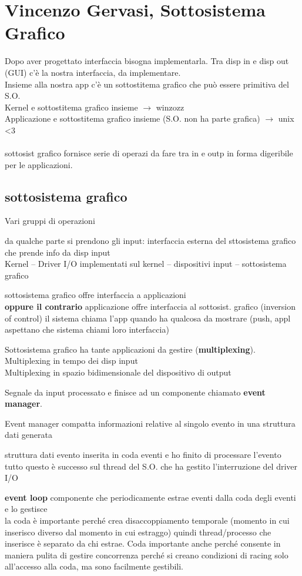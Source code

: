 \documentclass[10pt]{article}
\begin{document}
\section{Vincenzo Gervasi, Sottosistema Grafico}
Dopo aver progettato interfaccia bisogna implementarla. Tra disp in e disp out (GUI) c'è la nostra interfaccia, da implementare.\\
Insieme alla nostra app c'è un sottostitema grafico che può essere primitiva del S.O.\\
Kernel e sottostitema grafico insieme $\rightarrow$ winzozz\\
Applicazione e sottostitema grafico insieme (S.O. non ha parte grafica) $\rightarrow$ unix <3\\\\
sottosist grafico fornisce serie di operazi da fare tra in e outp in forma digeribile per le applicazioni.
\subsection{sottosistema grafico}
Vari gruppi di operazioni
\begin{list}{}{}
\item da qualche parte si prendono gli input: interfaccia esterna del sttosistema grafico che prende info da disp input\\
Kernel -- Driver I/O implementati sul kernel -- dispositivi input -- sottosistema grafico
\item sottosistema grafico offre interfaccia a applicazioni\\
\textbf{oppure il contrario} applicazione offre interfaccia al sottosist. grafico (inversion of control) il sistema chiama l'app quando ha qualcosa da mostrare (push, appl aspettano che sistema chiami loro interfaccia)
\item Sottosistema grafico ha tante applicazioni da gestire (\textbf{multiplexing}).\\
Multiplexing in tempo dei disp input\\
Multiplexing in spazio bidimensionale del dispositivo di output\\
\item Segnale da input processato e finisce ad un componente  chiamato \textbf{event manager}.
\item Event manager compatta informazioni relative al singolo evento in una struttura dati generata
\item struttura dati evento inserita in coda eventi e ho finito di processare l'evento\\
tutto questo è successo sul thread del S.O. che ha gestito l'interruzione del driver I/O
\item \textbf{event loop} componente che periodicamente estrae eventi dalla coda degli eventi e lo gestisce\\
la coda è importante perché crea disaccoppiamento temporale (momento in cui inserisco diverso dal momento in cui estraggo) quindi thread/processo che inserisce è separato da chi estrae. Coda importante anche perché consente in maniera pulita di gestire concorrenza perché si creano condizioni di racing solo all'accesso alla coda, ma sono facilmente gestibili.
\end{list}
\end{document}
